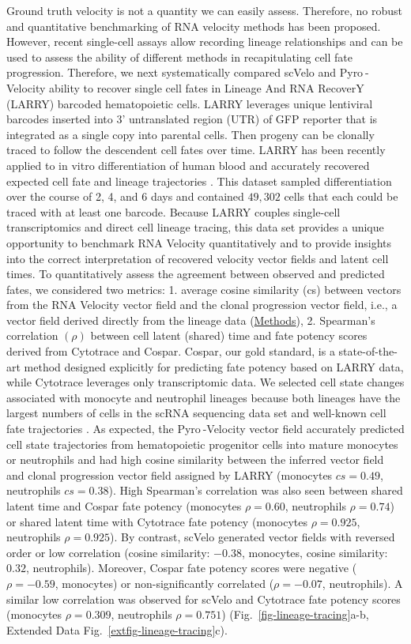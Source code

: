 \documentclass[
  sn-mathphys-num,
  lineno,
  twocolumn]{sn-jnl}
\begin{document}
Ground truth velocity is not a quantity we can easily assess. Therefore,
no robust and quantitative benchmarking of RNA velocity methods has been
proposed. However, recent single-cell assays allow recording lineage
relationships and can be used to assess the ability of different methods
in recapitulating cell fate progression. Therefore, we next
systematically compared scVelo and Pyro -Velocity ability to recover
single cell fates in Lineage And RNA RecoverY (LARRY) barcoded
hematopoietic cells. LARRY leverages unique lentiviral barcodes inserted
into 3' untranslated region (UTR) of GFP reporter that is integrated as
a single copy into parental cells. Then progeny can be clonally traced
to follow the descendent cell fates over time. LARRY has been recently
applied to in vitro differentiation of human blood and accurately
recovered expected cell fate and lineage trajectories
\citep{Weinreb2020-mv}. This dataset sampled differentiation over the
course of 2, 4, and 6 days and contained \(49,302\) cells that each
could be traced with at least one barcode. Because LARRY couples
single-cell transcriptomics and direct cell lineage tracing, this data
set provides a unique opportunity to benchmark RNA Velocity
quantitatively and to provide insights into the correct interpretation
of recovered velocity vector fields and latent cell times. To
quantitatively assess the agreement between observed and predicted
fates, we considered two metrics: 1. average cosine similarity (cs)
between vectors from the RNA Velocity vector field and the clonal
progression vector field, i.e., a vector field derived directly from the
lineage data (\hyperref[sec-methods]{Methods}), 2. Spearman's
correlation \((\rho)\) between cell latent (shared) time and fate
potency scores derived from Cytotrace and Cospar. Cospar, our gold
standard, is a state-of-the-art method designed explicitly for
predicting fate potency based on LARRY data, while Cytotrace leverages
only transcriptomic data. We selected cell state changes associated with
monocyte and neutrophil lineages because both lineages have the largest
numbers of cells in the scRNA sequencing data set and well-known cell
fate trajectories \citep{Petukhov2018-nr}. As expected, the
Pyro -Velocity vector field accurately predicted cell state trajectories
from hematopoietic progenitor cells into mature monocytes or neutrophils
and had high cosine similarity between the inferred vector field and
clonal progression vector field assigned by LARRY (monocytes
\(cs=0.49\), neutrophils \(cs=0.38\)). High Spearman's correlation was
also seen between shared latent time and Cospar fate potency (monocytes
\(\rho=0.60\), neutrophils \(\rho=0.74\)) or shared latent time with
Cytotrace fate potency (monocytes \(\rho=0.925\), neutrophils
\(\rho=0.925\)). By contrast, scVelo generated vector fields with
reversed order or low correlation (cosine similarity: \(-0.38\),
monocytes, cosine similarity: \(0.32\), neutrophils). Moreover, Cospar
fate potency scores were negative (\(\rho=-0.59\), monocytes) or
non-significantly correlated (\(\rho=-0.07\), neutrophils). A similar
low correlation was observed for scVelo and Cytotrace fate potency
scores (monocytes \(\rho=0.309\), neutrophils \(\rho=0.751\))
(Fig.~\ref{fig-lineage-tracing}a-b,
Extended Data Fig.~\ref{extfig-lineage-tracing}c).
\end{document}
